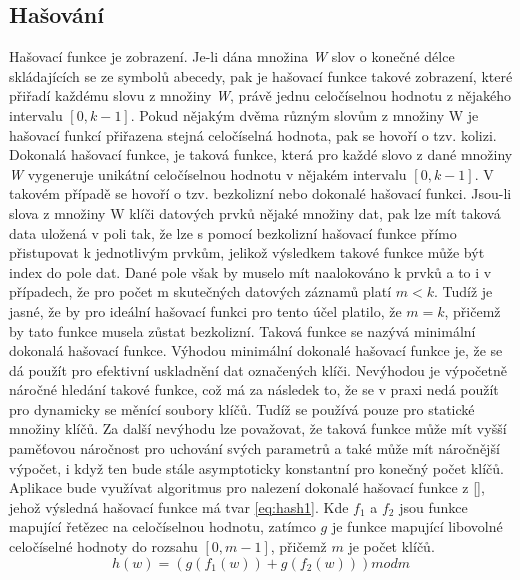 \documentclass[11pt,twoside,a4paper]{book}
\begin{document}
{{\begin{ttemize}
{{\subsection {\label{SEC:hashP} Hašování}
Hašovací funkce je zobrazení. Je-li dána množina \textit{W} slov o konečné délce skládajících se ze symbolů abecedy, pak je hašovací funkce takové zobrazení, které přiřadí každému slovu z množiny \textit{W}, právě jednu celočíselnou hodnotu z nějakého intervalu $[0,k-1]$. Pokud nějakým dvěma různým slovům z množiny W je hašovací funkcí přiřazena stejná celočíselná hodnota, pak se hovoří o tzv. kolizi.
Dokonalá hašovací funkce, je taková funkce, která pro každé slovo z dané množiny \textit{W} vygeneruje unikátní celočíselnou hodnotu v nějakém intervalu $[0,k-1]$. V takovém případě se hovoří o tzv. bezkolizní nebo dokonalé hašovací funkci. Jsou-li slova z množiny W klíči datových prvků nějaké množiny dat, pak lze mít taková data uložená v poli tak, že lze s pomocí bezkolizní hašovací funkce přímo přistupovat k jednotlivým prvkům, jelikož výsledkem takové funkce může být index do pole dat. Dané pole však by muselo mít naalokováno k prvků a to i v případech, že pro počet m skutečných datových záznamů platí $m<k$. Tudíž je jasné, že by pro ideální hašovací funkci pro tento účel platilo, že $m=k$, přičemž by tato funkce musela zůstat bezkolizní. Taková funkce se nazývá minimální dokonalá hašovací funkce.
Výhodou minimální dokonalé hašovací funkce je, že se dá použít pro efektivní uskladnění dat označených klíči. Nevýhodou je výpočetně náročné hledání takové funkce, což má za následek to, že se v praxi nedá použít pro dynamicky se měnící soubory klíčů. Tudíž se používá pouze pro statické množiny klíčů. Za další nevýhodu lze považovat, že taková funkce může mít vyšší paměťovou náročnost pro uchování svých parametrů a také může mít náročnější výpočet, i když ten bude stále asymptoticky konstantní pro konečný počet klíčů.
Aplikace bude využívat algoritmus pro nalezení dokonalé hašovací funkce z [\cite{bib:hashPerfect}], jehož výsledná hašovací funkce má tvar \ref{eq:hash1}.
Kde $f_1$ a $f_2$ jsou funkce mapující řetězec na celočíselnou hodnotu, zatímco $g$ je funkce mapující libovolné celočíselné hodnoty do rozsahu $[0,m-1]$, přičemž $m$ je počet klíčů. 
\begin{equation} \label{eq:hash1}
h(w) = (g(f_1(w))+g(f_2(w))) mod m
\end{equation}
}}
\end{ttemize}}}
\end{document}
